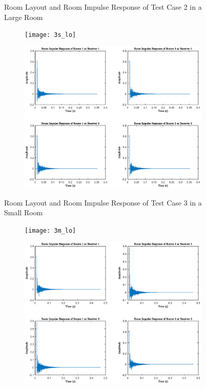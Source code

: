 \documentclass[a4paper,twoside,12pt,hidelinks]{article}
\begin{document}
\begin{appendices}
\begin{figure}[H]
\begin{subfigure}[H]{0.55\textwidth}
\end{subfigure}
\caption{Room Layout and Room Impulse Response of Test Case 2 in a Large Room}
\end{figure}
\newpage
\begin{figure}[H]
\centering
\begin{subfigure}[H]{0.44\textwidth}
\texttt{[image: 3s\_lo]}
\end{subfigure}
\begin{subfigure}[H]{0.55\textwidth}
\includegraphics[width=\textwidth]{3s_ir}
\end{subfigure}
\caption{Room Layout and Room Impulse Response of Test Case 3 in a Small Room}
\end{figure}
\begin{figure}[H]
\centering
\begin{subfigure}[H]{0.44\textwidth}
\texttt{[image: 3m\_lo]}
\end{subfigure}
\begin{subfigure}[H]{0.55\textwidth}
\includegraphics[width=\textwidth]{3m_ir}

\end{subfigure}
\end{figure}
\end{appendices}
\end{document}
